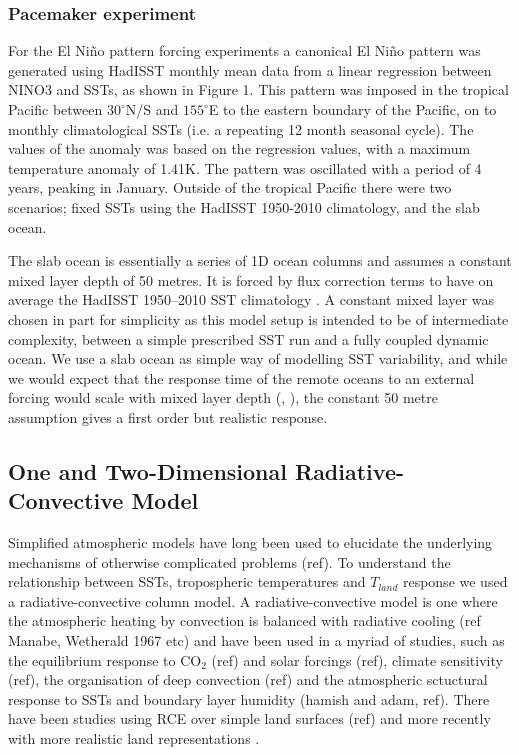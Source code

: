 \subsubsection{Pacemaker experiment}\label{methods:pacemaker}
For the El Ni{\~n}o pattern forcing experiments a canonical El Ni{\~n}o pattern 
was generated using HadISST monthly mean data from a linear regression between 
NINO3 and SSTs, as shown in Figure 1. This pattern was imposed in the tropical 
Pacific between $30^{\circ}$N/S and $155^{\circ}$E to the eastern boundary of 
the Pacific, on to monthly climatological SSTs (i.e. a repeating 12 month 
seasonal cycle).  The values of the anomaly was based on the regression values, 
with a maximum temperature anomaly of 1.41K.  The pattern was oscillated with a 
period of 4 years, peaking in January.  Outside of the tropical Pacific there 
were two scenarios; fixed SSTs using the HadISST 1950-2010 climatology, and the 
slab ocean.  

The slab ocean is essentially a series of 1D ocean columns and assumes a 
constant mixed layer depth of 50 metres. It is forced by flux correction terms 
to have on average the HadISST 1950--2010 SST climatology \citep{Wang2014}. A 
constant mixed layer was chosen in part for simplicity as this model setup is 
intended to be of intermediate complexity, between a simple prescribed SST run 
and a fully coupled dynamic ocean. We use a slab ocean as simple way of 
modelling SST variability, and while we would expect that the response time of 
the remote oceans to an external forcing would scale with mixed layer depth 
(\citealt{Su2005a}, \citealt{Lintner2007}), the constant 50 metre assumption 
gives a first order but realistic response.  


\subsection{One and Two-Dimensional Radiative-Convective Model}
Simplified atmospheric models have long been used to elucidate the underlying 
mechanisms of otherwise complicated problems (ref). To understand the 
relationship between SSTs, tropospheric temperatures and $T_{land}$ response we 
used a radiative-convective column model. A radiative-convective model is one 
where the atmospheric heating by convection is balanced with radiative cooling 
(ref Manabe, Wetherald 1967 etc) and have been used in a myriad of studies, such 
as the equilibrium response to CO$_2$ (ref) and solar forcings (ref), climate 
sensitivity (ref), the organisation of deep convection (ref) and the atmospheric 
sctuctural response to SSTs and boundary layer humidity (hamish and adam, ref).  
There have been studies using RCE over simple land surfaces (ref) and more 
recently with more realistic land representations \citep{Rochetin2014}.

